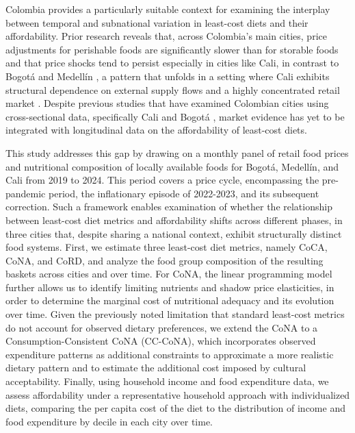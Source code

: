 \documentclass[Afour, sageh,times]{sagej}
\begin{document}
\smallskip

Colombia provides a particularly suitable context for examining the interplay between temporal and subnational variation in least-cost diets and their affordability. Prior research reveals that, across Colombia's main cities, price adjustments for perishable foods are significantly slower than for storable foods and that price shocks tend to persist especially in cities like Cali, in contrast to Bogotá and Medellín \citep{Iregui2017, BanRep2020}, a pattern that unfolds in a setting where Cali exhibits structural dependence on external supply flows and a highly concentrated retail market \citep{Temple2015, Rankin2021}. Despite previous studies that have examined Colombian cities using cross-sectional data, specifically Cali \citep{Yoshioka2026} and Bogotá \citep{BaronaMontoya2026}, market evidence has yet to be integrated with longitudinal data on the affordability of least-cost diets.

\smallskip

This study addresses this gap by drawing on a monthly panel of retail food prices and nutritional composition of locally available foods for Bogotá, Medellín, and Cali from 2019 to 2024. This period covers a price cycle, encompassing the pre-pandemic period, the inflationary episode of 2022-2023, and its subsequent correction. Such a framework enables examination of whether the relationship between least-cost diet metrics and affordability shifts across different phases, in three cities that, despite sharing a national context, exhibit structurally distinct food systems. First, we estimate three least-cost diet metrics, namely CoCA, CoNA, and CoRD, and analyze the food group composition of the resulting baskets across cities and over time. For CoNA, the linear programming model further allows us to identify limiting nutrients and shadow price elasticities, in order to determine the marginal cost of nutritional adequacy and its evolution over time. Given the previously noted limitation that standard least-cost metrics do not account for observed dietary preferences, we extend the CoNA to a Consumption-Consistent CoNA (CC-CoNA), which incorporates observed expenditure patterns as additional constraints to approximate a more realistic dietary pattern and to estimate the additional cost imposed by cultural acceptability. Finally, using household income and food expenditure data, we assess affordability under a representative household approach with individualized diets, comparing the per capita cost of the diet to the distribution of income and food expenditure by decile in each city over time.
\end{document}
